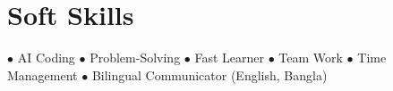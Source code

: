\section{Soft Skills}

\begin{onecolentry}
    \begin{highlights}
        \item[$\bullet$] AI Coding
        \quad $\bullet$ Problem-Solving
        \quad $\bullet$ Fast Learner
        \quad $\bullet$ Team Work
        \quad $\bullet$ Time Management
        \quad $\bullet$ Bilingual Communicator (English, Bangla)
    \end{highlights}
\end{onecolentry}

